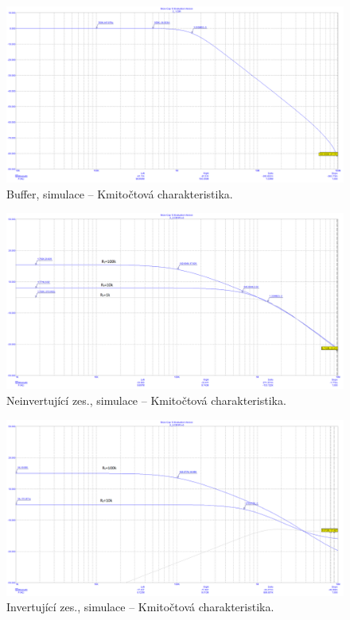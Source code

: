\documentclass{protokol}
\begin{document}
\begin{figure}[h!]
	\centering
	\includegraphics[width=\textwidth]{numerika/Buffer/5_kmitoctova_char.png}
	\centering
	\caption{Buffer, simulace -- Kmitočtová charakteristika.}
	\label{fig:b-s-kmitoctova}
\end{figure}


\begin{figure}[h!]
	\centering
	\includegraphics[width=\textwidth]{numerika/NonInverting/5_kmitoctova_char.png}
	\centering
	\caption{Neinvertující zes., simulace -- Kmitočtová charakteristika.}
	\label{fig:ni-s-kmitoctova}
\end{figure}
	
\begin{figure}[h!]
	\centering
	\includegraphics[width=\textwidth]{numerika/Inverting/4_kmitoctova_char.png}
	\centering
	\caption{Invertující zes., simulace -- Kmitočtová charakteristika.}
	\label{fig:i-s-kmitoctova}
\end{figure}
\end{document}
